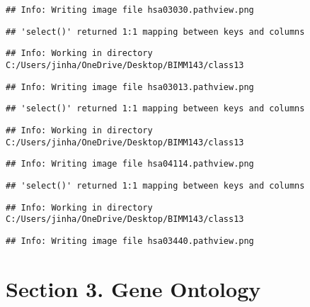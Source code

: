 \documentclass[
]{article}
\newenvironment{Shaded}{\begin{snugshade}}{\end{snugshade}}
\newcommand{\AttributeTok}[1]{\textcolor[rgb]{0.77,0.63,0.00}{#1}}
\newcommand{\CommentTok}[1]{\textcolor[rgb]{0.56,0.35,0.01}{\textit{#1}}}
\newcommand{\ConstantTok}[1]{\textcolor[rgb]{0.00,0.00,0.00}{#1}}
\newcommand{\FunctionTok}[1]{\textcolor[rgb]{0.00,0.00,0.00}{#1}}
\newcommand{\NormalTok}[1]{#1}
\newcommand{\OtherTok}[1]{\textcolor[rgb]{0.56,0.35,0.01}{#1}}
\newcommand{\SpecialCharTok}[1]{\textcolor[rgb]{0.00,0.00,0.00}{#1}}
\begin{document}
\begin{verbatim}
## Info: Writing image file hsa03030.pathview.png
\end{verbatim}

\begin{verbatim}
## 'select()' returned 1:1 mapping between keys and columns
\end{verbatim}

\begin{verbatim}
## Info: Working in directory C:/Users/jinha/OneDrive/Desktop/BIMM143/class13
\end{verbatim}

\begin{verbatim}
## Info: Writing image file hsa03013.pathview.png
\end{verbatim}

\begin{verbatim}
## 'select()' returned 1:1 mapping between keys and columns
\end{verbatim}

\begin{verbatim}
## Info: Working in directory C:/Users/jinha/OneDrive/Desktop/BIMM143/class13
\end{verbatim}

\begin{verbatim}
## Info: Writing image file hsa04114.pathview.png
\end{verbatim}

\begin{verbatim}
## 'select()' returned 1:1 mapping between keys and columns
\end{verbatim}

\begin{verbatim}
## Info: Working in directory C:/Users/jinha/OneDrive/Desktop/BIMM143/class13
\end{verbatim}

\begin{verbatim}
## Info: Writing image file hsa03440.pathview.png
\end{verbatim}

\hypertarget{section-3.-gene-ontology}{%
\section{Section 3. Gene Ontology}\label{section-3.-gene-ontology}}

\begin{Shaded}
\end{Shaded}
\end{document}
